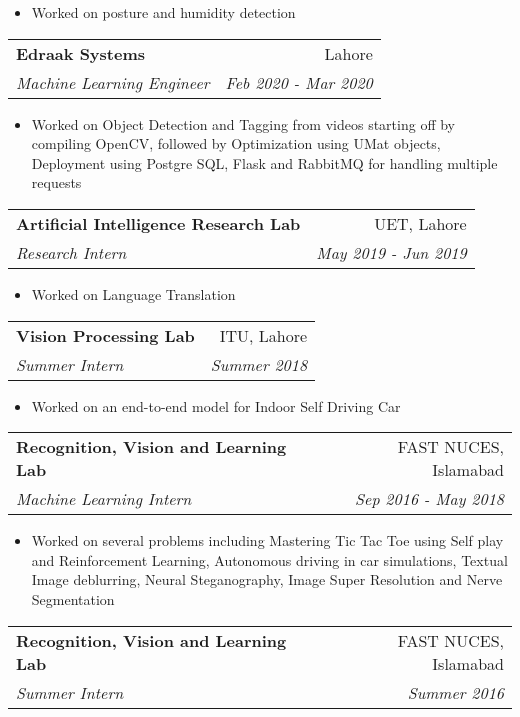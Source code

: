 \documentclass[letterpaper,11pt]{article}
\makeatletter
\newcommand{\resumeSubheading}[4]{
  \vspace{-1pt}\item
    \begin{tabular*}{0.97\textwidth}[t]{l@{\extracolsep{\fill}}r}
      \textbf{#1} & #2 \\
      \textit{\small#3} & \textit{\small #4} \\
    \end{tabular*}\vspace{-5pt}
}
\makeatother
\begin{document}
      			\begin{itemize}
  				\item Worked on posture and humidity detection
			\end{itemize}
			
						\resumeSubheading
      			{Edraak Systems}{Lahore}
      			{Machine Learning Engineer}{Feb 2020 - Mar 2020}
      			
      			\begin{itemize}

					\item Worked on Object Detection and Tagging from videos starting off by compiling OpenCV, followed by Optimization using UMat objects, Deployment using Postgre SQL, Flask and RabbitMQ for handling multiple requests  				
  				
			\end{itemize}
			
			\resumeSubheading
      			{Artificial Intelligence Research Lab}{UET, Lahore}
      			{Research Intern}{May 2019 - Jun 2019}
      
        
          \begin{itemize}
  				\item Worked on Language Translation
			\end{itemize}


           \resumeSubheading
      			{Vision Processing Lab}{ITU, Lahore}
      			{Summer Intern}{Summer 2018}
      
        
          \begin{itemize}
  				\item Worked on an end-to-end model for Indoor Self Driving Car
			\end{itemize}
 
           \resumeSubheading
      {Recognition, Vision and Learning Lab}{FAST NUCES, Islamabad}
      {Machine Learning Intern}{Sep 2016 - May 2018}
         
      
         \begin{itemize}
  				\item Worked on several problems including Mastering Tic Tac Toe using Self play and Reinforcement Learning, Autonomous driving in car
simulations, Textual Image deblurring, Neural Steganography, Image Super Resolution and Nerve Segmentation
  				
			\end{itemize}

     \resumeSubheading
      {Recognition, Vision and Learning Lab}{FAST NUCES, Islamabad}
      {Summer Intern}{Summer 2016}
      
\end{document}
